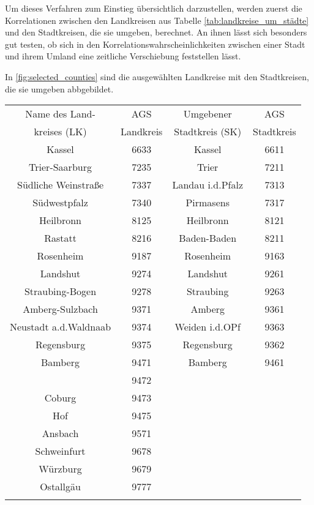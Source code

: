 Um dieses Verfahren zum Einstieg übersichtlich darzustellen, werden zuerst die Korrelationen zwischen den Landkreisen aus Tabelle \ref{tab:landkreise_um_städte} und den Stadtkreisen, die sie umgeben, berechnet. An ihnen lässt sich besonders gut testen, ob sich in den Korrelationswahrscheinlichkeiten zwischen einer Stadt und ihrem Umland eine zeitliche Verschiebung feststellen lässt.

In \autoref{fig:selected_counties} sind die ausgewählten Landkreise mit den Stadtkreisen, die sie umgeben abbgebildet.
\begin{table}[H]
    \centering
    \begin{tabular}{c|c|c|c}
    Name des Land-&AGS &Umgebener  &AGS\\
    kreises (LK)  &Landkreis&Stadtkreis (SK)&Stadtkreis\\
    \hline
Kassel & 6633 & Kassel & 6611 \\\hdashline
Trier-Saarburg & 7235 & Trier & 7211 \\\hdashline
Südliche Weinstraße & 7337 & Landau i.d.Pfalz & 7313 \\\hdashline
Südwestpfalz & 7340 & Pirmasens & 7317 \\\hdashline
Heilbronn & 8125 & Heilbronn & 8121 \\\hdashline
Rastatt & 8216 & Baden-Baden & 8211 \\\hdashline
Rosenheim & 9187 & Rosenheim & 9163 \\\hdashline
Landshut & 9274 & Landshut & 9261 \\\hdashline
Straubing-Bogen & 9278 & Straubing & 9263 \\\hdashline
Amberg-Sulzbach & 9371 & Amberg & 9361 \\\hdashline
Neustadt a.d.Waldnaab & 9374 & Weiden i.d.OPf & 9363 \\\hdashline
Regensburg & 9375 & Regensburg & 9362 \\\hdashline
Bamberg & 9471 & Bamberg & 9461 \\\hdashline
\begin{comment}
Bayreuth & 9472 &  &  \\\hdashline
Coburg & 9473 &  &  \\\hdashline
Hof & 9475 &  &  \\\hdashline
Ansbach & 9571 &  &  \\\hdashline
Schweinfurt & 9678 &  &  \\\hdashline
Würzburg & 9679 &  &  \\\hdashline
Ostallgäu & 9777 &  &  \\\hdashline

\end{comment}
\end{tabular}
\end{table}
